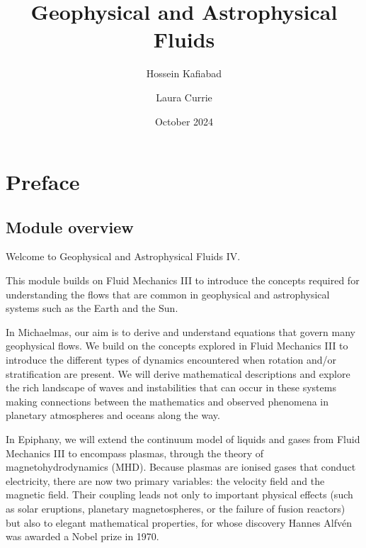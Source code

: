 \documentclass[
  letterpaper,
  twocolumn,
  landscape]{report}
\title{Geophysical and Astrophysical Fluids}
\author{Hossein Kafiabad \and Laura Currie}
\date{October 2024}
\renewcommand*\contentsname{Table of contents}
\newcommand\contentsname{Table of contents}
\begin{document}
\maketitle
\ifdefined\Shaded\renewenvironment{Shaded}{\begin{tcolorbox}[borderline west={3pt}{0pt}{shadecolor}, interior hidden, frame hidden, sharp corners, boxrule=0pt, breakable, enhanced]}{\end{tcolorbox}}\fi

\renewcommand*\contentsname{Table of contents}
{
\hypersetup{linkcolor=}
\setcounter{tocdepth}{2}
\tableofcontents
}
\listoffigures
\listoftables
{}

\hypertarget{preface}{%
\chapter*{Preface}\label{preface}}


\hypertarget{module-overview}{%
\section*{Module overview}\label{module-overview}}


Welcome to Geophysical and Astrophysical Fluids IV.

This module builds on Fluid Mechanics III to introduce the concepts
required for understanding the flows that are common in geophysical and
astrophysical systems such as the Earth and the Sun.

In Michaelmas, our aim is to derive and understand equations that govern
many geophysical flows. We build on the concepts explored in Fluid
Mechanics III to introduce the different types of dynamics encountered
when rotation and/or stratification are present. We will derive
mathematical descriptions and explore the rich landscape of waves and
instabilities that can occur in these systems making connections between
the mathematics and observed phenomena in planetary atmospheres and
oceans along the way.

In Epiphany, we will extend the continuum model of liquids and gases
from Fluid Mechanics III to encompass plasmas, through the theory of
magnetohydrodynamics (MHD). Because plasmas are ionised gases that
conduct electricity, there are now two primary variables: the velocity
field and the magnetic field. Their coupling leads not only to important
physical effects (such as solar eruptions, planetary magnetospheres, or
the failure of fusion reactors) but also to elegant mathematical
properties, for whose discovery Hannes Alfvén was awarded a Nobel prize
in 1970.
\end{document}
